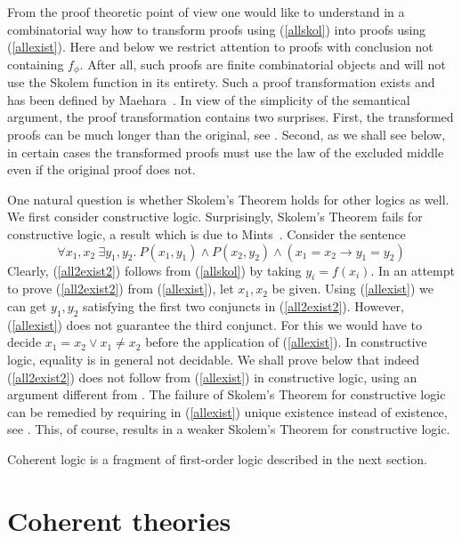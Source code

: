 \documentclass[10pt,a4paper]{article}
\begin{document}
From the proof theoretic point of view one would like to understand
in a combinatorial way how to transform proofs using (\ref{allskol}) into proofs
using  (\ref{allexist}).  Here and below we restrict attention to
proofs with conclusion not containing $f_\phi$. After all, such proofs are finite
combinatorial objects and will not use the Skolem function in its entirety.
Such a proof transformation exists and has been defined by Maehara~\cite{Maehara}. 
In view of the simplicity of the semantical argument, the proof transformation
contains two surprises.
First, the transformed proofs can be much longer than the original, see \cite{xxx}.
Second, as we shall see below, in certain cases the transformed proofs must use
the law of the excluded middle even if the original proof does not.

One natural question is whether Skolem's Theorem holds for other logics as well.
We first consider constructive logic. Surprisingly, Skolem's Theorem fails
for constructive logic, a result which is due to Mints~\cite{Mints}.
Consider the sentence
\begin{equation}\label{all2exist2}
\forall x_1,x_2~\exists y_1,y_2.~P(x_1,y_1) \land P(x_2,y_2) \land (x_1 = x_2 \to y_1 = y_2)
\end{equation}
Clearly,  (\ref{all2exist2}) follows from (\ref{allskol}) by taking $y_i = f(x_i)$.
In an attempt to prove (\ref{all2exist2}) from (\ref{allexist}), let $x_1,x_2$ be given.
Using (\ref{allexist}) we can get $y_1,y_2$ satisfying the first two conjuncts
in (\ref{all2exist2}). However, (\ref{allexist}) does not guarantee the third conjunct.
For this we would have to decide $ x_1 = x_2 \lor x_1 \neq x_2$ before the
application of (\ref{allexist}). In constructive logic, equality is in general not decidable.
We shall prove below that indeed (\ref{all2exist2}) does not follow from  (\ref{allexist})
in constructive logic, using an argument different from \cite{Mints}.
The failure of Skolem's Theorem for constructive logic can be remedied by 
requiring in (\ref{allexist}) unique existence instead of existence, see \cite{xxx}.
This, of course, results in a weaker Skolem's Theorem for constructive logic.

Coherent logic is a fragment of first-order logic described in the next section.



\section{Coherent theories}\label{coherent}
 
\end{document}
